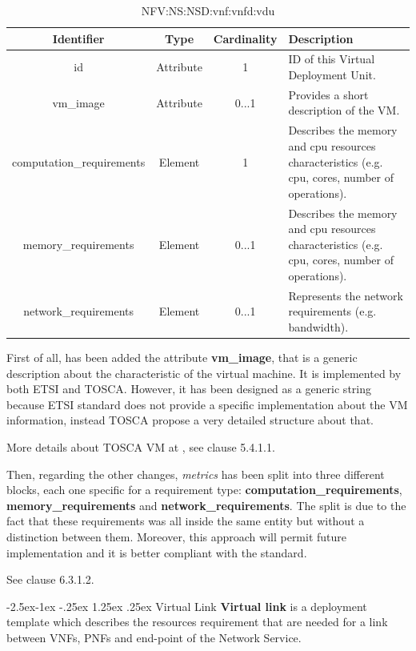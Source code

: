 \documentclass[11pt, english]{article}
\makeatletter
\renewcommand\paragraph{\@startsection{paragraph}{4}{\z@}%
            {-2.5ex\@plus -1ex \@minus -.25ex}%
            {1.25ex \@plus .25ex}%
            {\normalfont\normalsize\bfseries}}
\makeatother
\begin{document}
\begin{table}[ht]
    \centering
    \begin{tabular}{c|c|c|m{7cm}}
    \hline
    Identifier & Type & Cardinality & Description \\
    \hline
    \rowcolor{Gray}
    id & Attribute & 1 & ID of this Virtual Deployment Unit. \\
    \hline
    vm\_image & Attribute & 0...1 & Provides a short description of the VM. \\
    \hline
    \rowcolor{Gray}
    computation\_requirements & Element & 1 &  Describes the memory and cpu resources characteristics (e.g. cpu, cores, number of operations). \\
    \hline
    memory\_requirements & Element & 0...1 &  Describes the memory and cpu resources characteristics (e.g. cpu, cores, number of operations). \\
    \hline
    \rowcolor{Gray}
    network\_requirements & Element & 0...1 &  Represents the network requirements (e.g. bandwidth). \\
    \hline
    \end{tabular}
    \caption{NFV:NS:NSD:vnf:vnfd:vdu} \label{tab:tab8}
\end{table}

First of all, has been added the attribute \textbf{vm\_image}, that is a generic description about the  characteristic of the virtual machine. It is implemented by both ETSI and TOSCA. However, it has been designed as a generic string because ETSI standard does not provide a specific implementation about the VM information, instead TOSCA propose a very detailed structure about that.

More details about TOSCA VM at \cite{tosca}, see clause 5.4.1.1.

Then, regarding the other changes, \textit{metrics} has been split into three different blocks, each one specific for a requirement type: \textbf{computation\_requirements}, \textbf{memory\_requirements} and \textbf{network\_requirements}. The split is due to the fact that these requirements was all inside the same entity but without a distinction between them. Moreover, this approach will permit future implementation and it is better compliant with the standard.

See \cite{etsi} clause 6.3.1.2.

\newpage
\paragraph{Virtual Link}
\textbf{Virtual link} is a deployment template which describes the resources requirement that are needed for a link between VNFs, PNFs and end-point of the Network Service.
\end{document}
